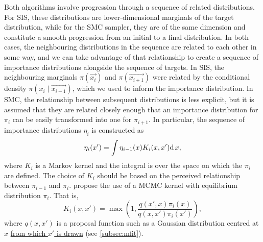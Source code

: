 {Both algorithms involve progression through a sequence of related
distributions. For \gls{SIS}, these distributions are lower-dimensional
marginals of the target distribution, while for the \gls{SMC} sampler, they are
of the same dimension and constitute a smooth progression from an initial to a
final distribution. In both cases, the neighbouring distributions in the
sequence are related to each other in some way, and we can take advantage of
that relationship to create a sequence of importance distributions alongside
the sequence of targets. In \gls{SIS}, the neighbouring marginals
$\pi(\vec{x_i})$ and $\pi(\vec{x_{i+1}})$ were related by the conditional
density $\pi(x_i \mid \vec{x_{i-1}})$, which we used to inform the importance
distribution. In \gls{SMC}, the relationship between subsequent distributions
is less explicit, but it is assumed that they are related closely enough that
an importance distribution for $\pi_i$ can be easily transformed into one for
$\pi_{i+1}$. In particular, the sequence of importance distributions $\eta_i$
is constructed as
\begin{align}
  \label{eq:impint}
  \eta_i(x') = \int \eta_{i-1}(x) K_i(x, x') \mathrm{d}\, x,
\end{align}
where $K_i$ is a Markov kernel and the integral is over the space on which the
$\pi_i$ are defined. The choice of $K_i$ should be based on the perceived
relationship between $\pi_{i-1}$ and $\pi_i$. \textcite{del2006sequential}
propose the use of a \gls{MCMC} kernel with equilibrium distribution $\pi_i$.
That is,
\[
  K_i(x, x') = \max\left(1, \frac{q(x', x)\pi_i(x)}{q(x, x')\pi_i(x')}\right),
\]
where $q(x, x')$ is a proposal function such as a Gaussian distribution
centred at $x$ {\color{blue}\uline{from which $x'$ is drawn}} (see
\cref{subsec:mfit}). 

}
